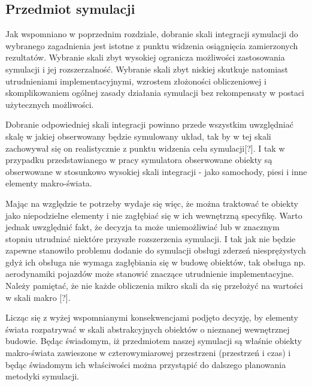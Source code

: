 \subsection{Przedmiot symulacji}
\par{
Jak wspomniano w poprzednim rozdziale, dobranie skali integracji symulacji do wybranego zagadnienia jest istotne z punktu widzenia osiągnięcia zamierzonych rezultatów. Wybranie skali zbyt wysokiej ogranicza możliwości zastosowania symulacji i jej rozszerzalność. Wybranie skali zbyt niskiej skutkuje natomiast utrudnieniami implementacyjnymi, wzrostem złożoności obliczeniowej i skomplikowaniem ogólnej zasady działania symulacji bez rekompensaty w postaci użytecznych możliwości.
}
\par{
Dobranie odpowiedniej skali integracji powinno przede wszystkim uwzględniać skalę w jakiej obserwowany będzie symulowany układ, tak by w tej skali zachowywał się on realistycznie z punktu widzenia celu symulacji[?]. I tak w przypadku przedstawianego w pracy symulatora obserwowane obiekty są obserwowane w stosunkowo wysokiej skali integracji - jako samochody, piesi i inne elementy makro-świata.
}
\par{
Mając na względzie te potrzeby wydaje się więc, że można traktować te obiekty jako niepodzielne elementy i nie zagłębiać się w ich wewnętrzną specyfikę. Warto jednak uwzględnić fakt, że decyzja ta może uniemożliwiać lub w znacznym stopniu utrudniać niektóre przyszłe rozszerzenia symulacji. I tak jak nie będzie zapewne stanowiło problemu dodanie do symulacji obsługi zderzeń niesprężystych gdyż ich obsługa nie wymaga zagłębiania się w budowę obiektów, tak obsługa np. aerodynamiki pojazdów może stanowić znaczące utrudnienie implementacyjne. Należy pamiętać, że nie każde obliczenia mikro skali da się przełożyć na wartości w skali makro [?].
}
\par{
Licząc się z wyżej wspomnianymi konsekwencjami podjęto decyzję, by elementy świata rozpatrywać w skali abstrakcyjnych obiektów o nieznanej wewnętrznej budowie. Będąc świadomym, iż przedmiotem naszej symulacji są właśnie obiekty makro-świata zawieszone w czterowymiarowej przestrzeni (przestrzeń i czas) i będąc świadomym ich właściwości można przystąpić do dalszego planowania metodyki symulacji.
}

